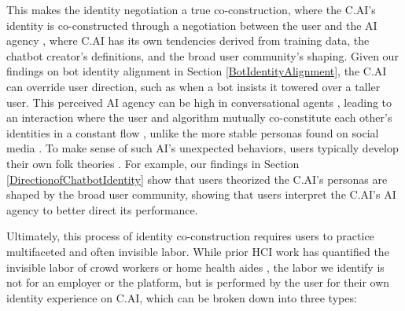\documentclass[sigconf, nonacm]{acmart}
\begin{document}
This makes the identity negotiation a true co-construction, where the C.AI's identity is co-constructed through a negotiation between the user and the AI agency \cite{kang2022ai, van2021revising}, where C.AI has its own tendencies derived from training data, the chatbot creator's definitions, and the broad user community's shaping. Given our findings on bot identity alignment in Section \ref{BotIdentityAlignment}, the C.AI can override user direction, such as when a bot insists it towered over a taller user. This perceived AI agency can be high in conversational agents \cite{waytz2014mind}, leading to an interaction where the user and algorithm mutually co-constitute each other's identities in a constant flow \cite{baumer2024algorithmic}, unlike the more stable personas found on social media \cite{tufekci2008can}. To make sense of such AI's unexpected behaviors, users typically develop their own folk theories \cite{devito2021adaptive}. For example, our findings in Section \ref{DirectionofChatbotIdentity} show that users theorized the C.AI's personas are shaped by the broad user community, showing that users interpret the C.AI's AI agency to better direct its performance.

Ultimately, this process of identity co-construction requires users to practice multifaceted and often invisible labor. While prior HCI work has quantified the invisible labor of crowd workers \cite{toxtli2021quantifying} or home health aides \cite{ming2023go}, the labor we identify is not for an employer or the platform, but is performed by the user for their own identity experience on C.AI, which can be broken down into three types:
\end{document}
